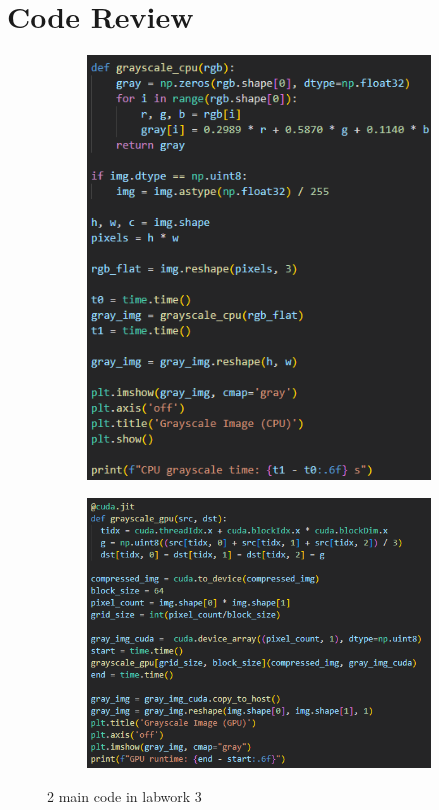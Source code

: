 \documentclass[12pt]{article}
\begin{document}
\section{Code Review}
\begin{figure}[H]
    \begin{subfigure}
        {.5\textwidth}
        \centering
        \includegraphics[width=0.7\linewidth]{images/code1.png}
    \end{subfigure}
    \begin{subfigure}
        {.5\textwidth}
        \centering
        \includegraphics[width=1.1\linewidth]{images/code2.png}
    \end{subfigure}
    \caption{2 main code in labwork 3}
\end{figure}
\end{document}
